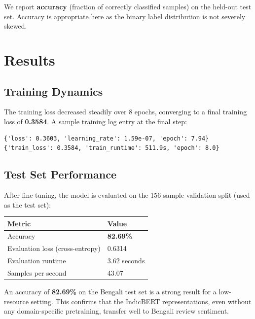 \documentclass[11pt,a4paper]{article}
\begin{document}
We report \textbf{accuracy} (fraction of correctly classified samples) on the held-out test set. Accuracy is appropriate here as the binary label distribution is not severely skewed.

\section{Results}

\subsection{Training Dynamics}

The training loss decreased steadily over 8 epochs, converging to a final training loss of \textbf{0.3584}. A sample training log entry at the final step:
\begin{lstlisting}
{'loss': 0.3603, 'learning_rate': 1.59e-07, 'epoch': 7.94}
{'train_loss': 0.3584, 'train_runtime': 511.9s, 'epoch': 8.0}
\end{lstlisting}

\subsection{Test Set Performance}

After fine-tuning, the model is evaluated on the 156-sample validation split (used as the test set):

\begin{center}
\begin{tabular}{ll}
\toprule
\textbf{Metric} & \textbf{Value} \\
\midrule
Accuracy                       & \textbf{82.69\%} \\
Evaluation loss (cross-entropy)& 0.6314 \\
Evaluation runtime             & 3.62 seconds \\
Samples per second             & 43.07 \\
\bottomrule
\end{tabular}
\end{center}

An accuracy of \textbf{82.69\%} on the Bengali test set is a strong result for a low-resource setting. This confirms that the IndicBERT representations, even without any domain-specific pretraining, transfer well to Bengali review sentiment.
\end{document}
